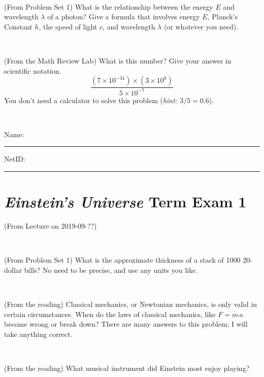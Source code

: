 \documentclass[12pt, letterpaper]{article}
\begin{document}
\vfill ~

\begin{problem} (From Problem Set 1)
What is the relationship between the energy $E$ and wavelength
$\lambda$ of a photon? Give a formula that involves energy $E$,
Planck's Constant $h$, the speed of light $c$, and wavelength
$\lambda$ (or whatever you need).
\end{problem}

\vfill ~

\begin{problem} (From the Math Review Lab)
What is this number? Give your answer in scientific notation.
$$
\frac{(7\times10^{-34})\times(3\times10^8)}{5\times10^{-7}}
$$
You don't need a calculator to solve this problem (\textit{hint: $3/5=0.6$}).
\end{problem}


\vfill ~


\cleardoublepage



\noindent
Name: \rule[-1ex]{0.60\textwidth}{0.1pt}
NetID: \rule[-1ex]{0.20\textwidth}{0.1pt}

\section*{\textsl{Einstein's Universe} Term Exam 1}
\setcounter{problem}{1}


\begin{problem} (From Lecture on 2019-09-??)
\end{problem}


\vfill ~

\begin{problem} (From Problem Set 1)
What is the approximate thickness of a stack of 1000 20-dollar bills?
No need to be precise, and use any units you like.
\end{problem}


\vfill ~

\begin{problem} (From the reading)
Classical mechanics, or Newtonian mechanics, is only valid in certain
circumstances. When do the laws of classical mechanics, like $F =
m\,a$ become wrong or break down? There are many answers to this
problem; I will take anything correct.
\end{problem}


\vfill ~

\begin{problem} (From the reading)
What musical instrument did Einstein most enjoy playing?
\end{problem}
\end{document}
